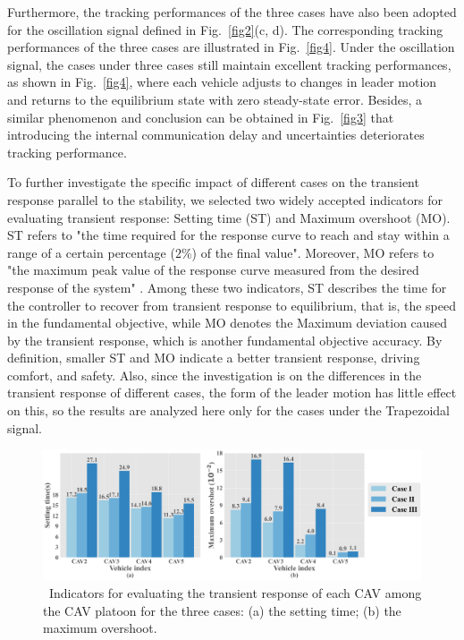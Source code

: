 \documentclass[journal]{IEEEtran}
\begin{document}
Furthermore, the tracking performances of the three cases have also been adopted for the oscillation signal defined in Fig.~\ref{fig2}(c, d). The corresponding tracking performances of the three cases are illustrated in Fig.~\ref{fig4}. Under the oscillation signal, the cases under three cases still maintain excellent tracking performances, as shown in Fig.~\ref{fig4}, where each vehicle adjusts to changes in leader motion and returns to the equilibrium state with zero steady-state error. Besides, a similar phenomenon and conclusion can be obtained in Fig.~\ref{fig3} that introducing the internal communication delay and uncertainties deteriorates tracking performance.

To further investigate the specific impact of different cases on the transient response parallel to the stability, we selected two widely accepted indicators for evaluating transient response: Setting time (ST) and Maximum overshoot (MO). ST refers to "the time required for the response curve to reach and stay within a range of a certain percentage ($2\%$) of the final value". Moreover, MO refers to "the maximum peak value of the response curve measured from the desired response of the system" \citep{ogata1995discrete}. Among these two indicators, ST describes the time for the controller to recover from transient response to equilibrium, that is, the speed in the fundamental objective, while MO denotes the Maximum deviation caused by the transient response, which is another fundamental objective accuracy. By definition, smaller ST and MO indicate a better transient response, driving comfort, and safety. Also, since the investigation is on the differences in the transient response of different cases, the form of the leader motion has little effect on this, so the results are analyzed here only for the cases under the Trapezoidal signal.


\begin{figure}
  \centering
  \includegraphics[width=16cm]{figs/fig5.png}
  \caption{~Indicators for evaluating the transient response of each CAV among the CAV platoon for the three cases: (a) the setting time; (b) the maximum overshoot.}
  \label{fig5}
\end{figure}
\end{document}
